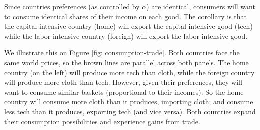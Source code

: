 \documentclass[11pt,letterpaper]{article}
\begin{document}
Since countries preferences (as controlled by $\alpha$) are identical, consumers will want to consume identical shares of their income on each good. The corollary is that the capital intensive country (home) will export the capital intensive good (tech) while the labor intensive country (foreign) will export the labor intensive good.

We illustrate this on Figure \ref{fig: consumption-trade}. Both countries face the same world prices, so the brown lines are parallel across both panels. The home country (on the left) will produce more tech than cloth, while the foreign country will produce more cloth than tech. However, given their preferences, they will want to consume similar baskets (proportional to their incomes). So the home country will consume more cloth than it produces, importing cloth; and consume less tech than it produces, exporting tech (and vice versa). Both countries expand their consumption possibilities and experience gains from trade.


\vspace{12pt}
\end{document}
